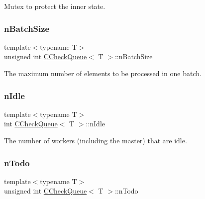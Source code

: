 Mutex to protect the inner state. 

\mbox{\label{class_c_check_queue_ae5d2df2dfa32a0b7f514bcd5debc52da}} 
\subsubsection{\texorpdfstring{n\+Batch\+Size}{nBatchSize}}
{\footnotesize\ttfamily template$<$typename T$>$ \\
unsigned int \mbox{\hyperlink{class_c_check_queue}{C\+Check\+Queue}}$<$ T $>$\+::n\+Batch\+Size\hspace{0.3cm}{\ttfamily [private]}}



The maximum number of elements to be processed in one batch. 

\mbox{\label{class_c_check_queue_a1fe215c60f972ee5e69501d8d1acbe0d}} 
\subsubsection{\texorpdfstring{n\+Idle}{nIdle}}
{\footnotesize\ttfamily template$<$typename T$>$ \\
int \mbox{\hyperlink{class_c_check_queue}{C\+Check\+Queue}}$<$ T $>$\+::n\+Idle\hspace{0.3cm}{\ttfamily [private]}}



The number of workers (including the master) that are idle. 

\mbox{\label{class_c_check_queue_a07acb246ed2003ae8083f2d0bda903da}} 
\subsubsection{\texorpdfstring{n\+Todo}{nTodo}}
{\footnotesize\ttfamily template$<$typename T$>$ \\
unsigned int \mbox{\hyperlink{class_c_check_queue}{C\+Check\+Queue}}$<$ T $>$\+::n\+Todo\hspace{0.3cm}{\ttfamily [private]}}

